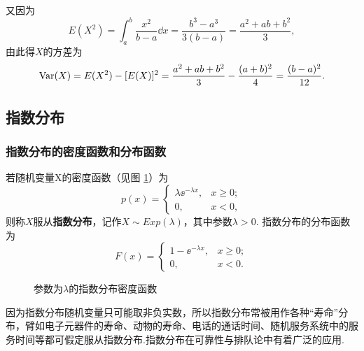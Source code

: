 又因为
\[
  E(X^2) = \int_a^b\frac{x^2}{b-a} \dd x = \frac{b^3-a^3}{3(b-a)} = \frac{a^2+ab+b^2}3,
\]
由此得$X$的方差为
\[
  \operatorname{Var}(X) = E(X^2) - [E(X)]^2 = \frac{a^2+ab+b^2}3 - \frac{(a+b)^2}4 = \frac{(b-a)^2}{12}.
\]

\subsection{指数分布}
\subsubsection{指数分布的密度函数和分布函数}
若随机变量X的密度函数（见图 \ref{fig2.5.4}）为
\begin{equation}\label{eq2.5.8}
  p(x) = \begin{cases}
    \lambda \ee^{-\lambda x}, & x \ge 0; \\
    0, & x < 0,
  \end{cases}
\end{equation}
则称$X$服从\textbf{指数分布}，记作$X\sim Exp(\lambda)$，其中参数$\lambda>0$. 指数分布的分布函数为
\begin{equation}\label{eq2.5.9}
  F(x) = \begin{cases}
    1 - \ee^{-\lambda x}, & x \ge 0; \\
    0, & x < 0.
  \end{cases}
\end{equation}

\begin{figure}[!ht]
  \centering
{}
  \caption{参数为$\lambda$的指数分布密度函数}\label{fig2.5.4}
\end{figure}

因为指数分布随机变量只可能取非负实数，所以指数分布常被用作各种“寿命”分布，臂如电子元器件的寿命、动物的寿命、电话的通话时间、随机服务系统中的服务时间等都可假定服从指数分布.指数分布在可靠性与排队论中有着广泛的应用.

